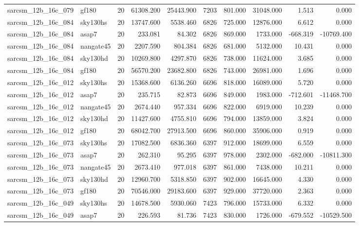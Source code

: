 \begin{tabular}{llrrrrrrrr}
sarcsm\_12b\_16c\_079 & gf180 & 20 & 61308.200 & 25443.900 & 7203 & 801.000 & 31048.000 & 1.513 & 0.000 \\
sarcsm\_12b\_16c\_084 & sky130hs & 20 & 13747.600 & 5538.460 & 6826 & 725.000 & 12876.000 & 6.612 & 0.000 \\
sarcsm\_12b\_16c\_084 & asap7 & 20 & 233.081 & 84.302 & 6826 & 869.000 & 1733.000 & -668.319 & -10769.400 \\
sarcsm\_12b\_16c\_084 & nangate45 & 20 & 2207.590 & 804.384 & 6826 & 681.000 & 5132.000 & 10.431 & 0.000 \\
sarcsm\_12b\_16c\_084 & sky130hd & 20 & 10269.800 & 4297.870 & 6826 & 738.000 & 11624.000 & 3.685 & 0.000 \\
sarcsm\_12b\_16c\_084 & gf180 & 20 & 56570.200 & 23682.800 & 6826 & 743.000 & 26981.000 & 1.696 & 0.000 \\
sarcsm\_12b\_16c\_012 & sky130hs & 20 & 15368.600 & 6136.260 & 6696 & 818.000 & 16089.000 & 5.720 & 0.000 \\
sarcsm\_12b\_16c\_012 & asap7 & 20 & 235.715 & 82.873 & 6696 & 849.000 & 1983.000 & -712.601 & -11468.700 \\
sarcsm\_12b\_16c\_012 & nangate45 & 20 & 2674.440 & 957.334 & 6696 & 822.000 & 6919.000 & 10.239 & 0.000 \\
sarcsm\_12b\_16c\_012 & sky130hd & 20 & 11427.600 & 4755.810 & 6696 & 794.000 & 13859.000 & 3.824 & 0.000 \\
sarcsm\_12b\_16c\_012 & gf180 & 20 & 68042.700 & 27913.500 & 6696 & 860.000 & 35906.000 & 0.919 & 0.000 \\
sarcsm\_12b\_16c\_073 & sky130hs & 20 & 17082.500 & 6836.360 & 6397 & 912.000 & 18699.000 & 6.559 & 0.000 \\
sarcsm\_12b\_16c\_073 & asap7 & 20 & 262.310 & 95.295 & 6397 & 978.000 & 2302.000 & -682.000 & -10811.300 \\
sarcsm\_12b\_16c\_073 & nangate45 & 20 & 2673.410 & 977.018 & 6397 & 861.000 & 7438.000 & 10.211 & 0.000 \\
sarcsm\_12b\_16c\_073 & sky130hd & 20 & 12960.700 & 5318.850 & 6397 & 902.000 & 16645.000 & 4.330 & 0.000 \\
sarcsm\_12b\_16c\_073 & gf180 & 20 & 70546.000 & 29183.600 & 6397 & 929.000 & 37720.000 & 2.363 & 0.000 \\
sarcsm\_12b\_16c\_049 & sky130hs & 20 & 14678.500 & 5930.060 & 7423 & 796.000 & 15733.000 & 6.332 & 0.000 \\
sarcsm\_12b\_16c\_049 & asap7 & 20 & 226.593 & 81.736 & 7423 & 830.000 & 1726.000 & -679.552 & -10529.500 \\

\end{tabular}
